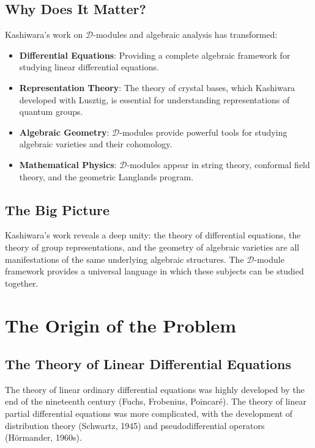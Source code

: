 \subsection{Why Does It Matter?}

Kashiwara's work on $\mathcal{D}$-modules and algebraic analysis has transformed:
\begin{itemize}
\item \textbf{Differential Equations}: Providing a complete algebraic framework for studying linear differential equations.
\item \textbf{Representation Theory}: The theory of crystal bases, which Kashiwara developed with Lusztig, is essential for understanding representations of quantum groups.
\item \textbf{Algebraic Geometry}: $\mathcal{D}$-modules provide powerful tools for studying algebraic varieties and their cohomology.
\item \textbf{Mathematical Physics}: $\mathcal{D}$-modules appear in string theory, conformal field theory, and the geometric Langlands program.
\end{itemize}

\subsection{The Big Picture}

Kashiwara's work reveals a deep unity: the theory of differential equations, the theory of group representations, and the geometry of algebraic varieties are all manifestations of the same underlying algebraic structures. The $\mathcal{D}$-module framework provides a universal language in which these subjects can be studied together.

\section{The Origin of the Problem}

\subsection{The Theory of Linear Differential Equations}

The theory of linear ordinary differential equations was highly developed by the end of the nineteenth century (Fuchs, Frobenius, Poincar\'e). The theory of linear partial differential equations was more complicated, with the development of distribution theory (Schwartz, 1945) and pseudodifferential operators (H\"ormander, 1960s).


